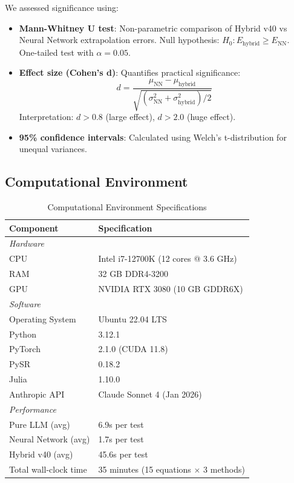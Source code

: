 \documentclass[twoside,11pt]{article}
\begin{document}
We assessed significance using:

\begin{itemize}
    \item \textbf{Mann-Whitney U test}: Non-parametric comparison of Hybrid v40 vs Neural Network extrapolation errors. Null hypothesis: $H_0: E_{\text{hybrid}} \geq E_{\text{NN}}$. One-tailed test with $\alpha = 0.05$.

    \item \textbf{Effect size (Cohen's d)}: Quantifies practical significance:
    \begin{equation}
    d = \frac{\mu_{\text{NN}} - \mu_{\text{hybrid}}}{\sqrt{(\sigma_{\text{NN}}^2 + \sigma_{\text{hybrid}}^2)/2}}
    \end{equation}
    Interpretation: $d > 0.8$ (large effect), $d > 2.0$ (huge effect).

    \item \textbf{95\% confidence intervals}: Calculated using Welch's t-distribution for unequal variances.
\end{itemize}

\subsection{Computational Environment}

\begin{table}[htbp]
\centering
\caption{Computational Environment Specifications}
\label{tab:environment}
\begin{tabular}{ll}
\toprule
\textbf{Component} & \textbf{Specification} \\
\midrule
\multicolumn{2}{l}{\textit{Hardware}} \\
CPU & Intel i7-12700K (12 cores @ 3.6 GHz) \\
RAM & 32 GB DDR4-3200 \\
GPU & NVIDIA RTX 3080 (10 GB GDDR6X) \\
\midrule
\multicolumn{2}{l}{\textit{Software}} \\
Operating System & Ubuntu 22.04 LTS \\
Python & 3.12.1 \\
PyTorch & 2.1.0 (CUDA 11.8) \\
PySR & 0.18.2 \\
Julia & 1.10.0 \\
Anthropic API & Claude Sonnet 4 (Jan 2026) \\
\midrule
\multicolumn{2}{l}{\textit{Performance}} \\
Pure LLM (avg) & 6.9s per test \\
Neural Network (avg) & 1.7s per test \\
Hybrid v40 (avg) & 45.6s per test \\
Total wall-clock time & 35 minutes (15 equations $\times$ 3 methods) \\
\bottomrule
\end{tabular}
\end{table}
\end{document}
